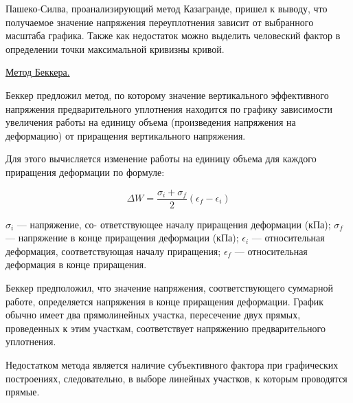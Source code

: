 Пашеко-Силва, проанализирующий метод Казагранде, пришел к выводу, 
что получаемое значение напряжения переуплотнения зависит от выбранного
масштаба графика. Также как недостаток можно выделить человеский 
фактор в определении точки максимальной кривизны кривой.


\underline{Метод Беккера.}

Беккер предложил метод, по которому значение вертикального эффективного 
напряжения предварительного уплотнения находится по 
графику зависимости увеличения работы на единицу объема 
(произведения напряжения на деформацию) от приращения вертикального напряжения.

Для этого вычисляется изменение работы на единицу объема для каждого
приращения деформации по формуле:

\[
   \Delta W = \frac{\sigma_i + \sigma_f}{2}(\epsilon_f - \epsilon_i)
\]

$\sigma_i$ --- напряжение, со-
ответствующее началу приращения деформации (кПа); 
$\sigma_f$ --- напряжение в конце приращения деформации (кПа);
$\epsilon_i$ --- относительная деформация, соответствующая началу приращения; 
$\epsilon_f$ --- относительная деформация в конце
приращения.

Беккер предположил, что значение напряжения, соответствующего суммарной 
работе, определяется напряжения в конце приращения деформации.
График обычно имеет два прямолинейных участка, пересечение 
двух прямых, проведенных к этим участкам, соответствует 
напряжению предварительного уплотнения. 

Недостатком метода является наличие субъективного фактора при
графических построениях, следовательно, в выборе линейных участков, 
к которым проводятся прямые.